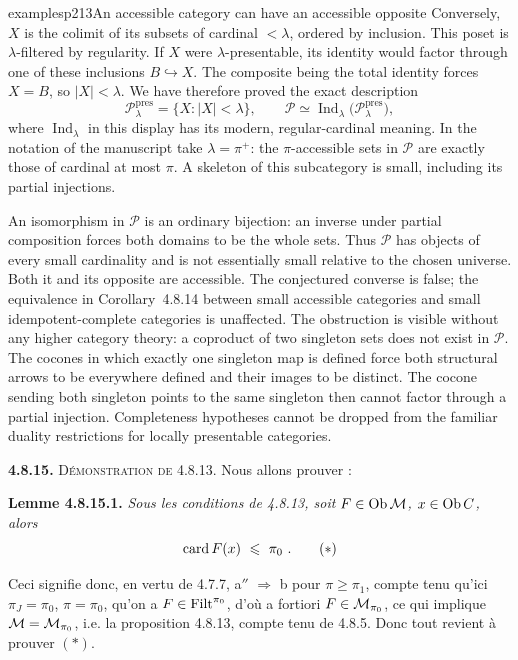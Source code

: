 \begin{dcomment}{examples}{p213}{An accessible category can have an accessible opposite}
Conversely, $X$ is the colimit of its subsets of cardinal $<\lambda$, ordered by inclusion. This poset is $\lambda$-filtered by regularity. If $X$ were $\lambda$-presentable, its identity would factor through one of these inclusions $B\hookrightarrow X$. The composite being the total identity forces $X=B$, so $|X|<\lambda$. We have therefore proved the exact description
\[
 \mathcal P_\lambda^{\mathrm{pres}}
   =\{X:|X|<\lambda\},\qquad
 \mathcal P\simeq
 \operatorname{Ind}_{\lambda}\bigl(\mathcal P_\lambda^{\mathrm{pres}}\bigr),
\]
where $\operatorname{Ind}_{\lambda}$ in this display has its modern, regular-cardinal meaning. In the notation of the manuscript take $\lambda=\pi^+$: the $\pi$-accessible sets in $\mathcal P$ are exactly those of cardinal at most $\pi$. A skeleton of this subcategory is small, including its partial injections.

An isomorphism in $\mathcal P$ is an ordinary bijection: an inverse under partial composition forces both domains to be the whole sets. Thus $\mathcal P$ has objects of every small cardinality and is not essentially small relative to the chosen universe. Both it and its opposite are accessible. The conjectured converse is false; the equivalence in Corollary~4.8.14 between small accessible categories and small idempotent-complete categories is unaffected. The obstruction is visible without any higher category theory: a coproduct of two singleton sets does not exist in $\mathcal P$. The cocones in which exactly one singleton map is defined force both structural arrows to be everywhere defined and their images to be distinct. The cocone sending both singleton points to the same singleton then cannot factor through a partial injection. Completeness hypotheses cannot be dropped from the familiar duality restrictions for locally presentable categories.
\end{dcomment}


\textbf{4.8.15.} \textsc{Démonstration de} 4.8.13. Nous allons prouver :

\textbf{Lemme 4.8.15.1.} \textit{Sous les conditions de 4.8.13, soit $F \in \operatorname{Ob}\mathcal{M}$, $x \in \operatorname{Ob} C$, alors}
\[
\operatorname{card} F(x) \ \leqslant\ \pi_0\ . \tag*{$(*)$}
\]

Ceci signifie donc, en vertu de 4.7.7, a$''$ $\Longrightarrow$ b pour $\pi \geqslant \pi_1$, compte tenu qu'ici $\pi_J = \pi_0$, $\pi = \pi_0$, qu'on a $F \in \operatorname{Filt}^{\pi_0}$, d'où a fortiori $F \in \mathcal{M}_{\pi_0}$, ce qui implique $\mathcal{M} = \mathcal{M}_{\pi_0}$, i.e. la proposition 4.8.13, compte tenu de 4.8.5. Donc tout revient à prouver $(*)$.

